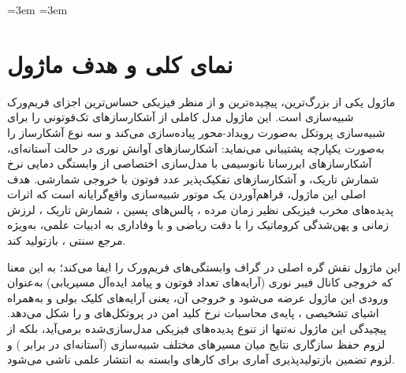 \sloppy
\emergencystretch=3em
\sloppy
\emergencystretch=3em


\section{نمای کلی و هدف ماژول}

ماژول  یکی از بزرگ‌ترین، پیچیده‌ترین و از منظر فیزیکی حساس‌ترین اجزای فریم‌ورک شبیه‌سازی  است. این ماژول مدل کاملی از آشکارسازهای تک‌فوتونی را برای شبیه‌سازی پروتکل  به‌صورت رویداد-محور  پیاده‌سازی می‌کند و سه نوع آشکارساز را به‌صورت یکپارچه پشتیبانی می‌نماید: آشکارسازهای آوانش نوری  در حالت آستانه‌ای، آشکارسازهای ابررسانا نانوسیمی  با مدل‌سازی اختصاصی از وابستگی دمایی نرخ شمارش تاریک، و آشکارسازهای تفکیک‌پذیر عدد فوتون  با خروجی شمارشی. هدف اصلی این ماژول، فراهم‌آوردن یک موتور شبیه‌سازی واقع‌گرایانه است که اثرات پدیده‌های مخرب فیزیکی نظیر زمان مرده ، پالس‌های پسین ، شمارش تاریک ، لرزش زمانی  و پهن‌شدگی کروماتیک  را با دقت ریاضی و با وفاداری به ادبیات علمی، به‌ویژه مرجع سنتی ، بازتولید کند.

این ماژول نقش گره اصلی در گراف وابستگی‌های فریم‌ورک را ایفا می‌کند؛ به این معنا که خروجی کانال فیبر نوری (آرایه‌های تعداد فوتون و پیامد ایده‌آل مسیریابی) به‌عنوان ورودی این ماژول عرضه می‌شود و خروجی آن، یعنی آرایه‌های کلیک بولی  و  به‌همراه اشیای تشخیصی ، پایه‌ی محاسبات نرخ کلید امن در پروتکل‌های  و  را شکل می‌دهد. پیچیدگی این ماژول نه‌تنها از تنوع پدیده‌های فیزیکی مدل‌سازی‌شده برمی‌آید، بلکه از لزوم حفظ سازگاری نتایج میان مسیرهای مختلف شبیه‌سازی (آستانه‌ای در برابر ) و لزوم تضمین بازتولیدپذیری آماری  برای کارهای وابسته به انتشار علمی ناشی می‌شود.


